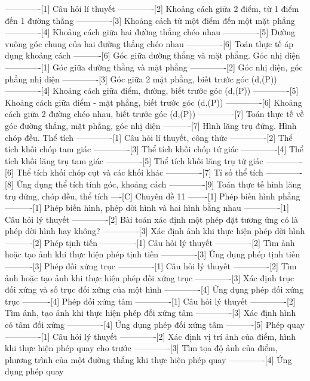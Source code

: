 -------------[1] Câu hỏi lí thuyết
-------------[2] Khoảng cách giữa 2 điểm, từ 1 điểm đến 1 đường thẳng
-------------[3] Khoảng cách từ một điểm đến một mặt phẳng
-------------[4] Khoảng cách giữa hai đường thẳng chéo nhau
-------------[5] Đường vuông góc chung của hai đường thẳng chéo nhau
-------------[6] Toán thực tế áp dụng khoảng cách
----------[6] Góc giữa đường thẳng và mặt phẳng. Góc nhị diện
-------------[1] Góc giữa đường thẳng và mặt phẳng
-------------[2] Góc nhị diện, góc phẳng nhị diện
-------------[3] Góc giữa 2 mặt phẳng, biết trước góc (d,(P))
-------------[4] Khoảng cách giữa điểm, đường, biết trước góc (d,(P))
-------------[5] Khoảng cách giữa điểm - mặt phẳng, biết trước góc (d,(P))
-------------[6] Khoảng cách giữa 2 đường chéo nhau, biết trước góc (d,(P))
-------------[7] Toán thực tế về góc đường thẳng, mặt phẳng, góc nhị diện
----------[7] Hình lăng trụ đứng. Hình chóp đều. Thể tích
-------------[1] Câu hỏi lí thuyết, công thức
-------------[2] Thể tích khối chóp tam giác
-------------[3] Thể tích khối chóp tứ giác
-------------[4] Thể tích khối lăng trụ tam giác
-------------[5] Thể tích khối lăng trụ tứ giác
-------------[6] Thể tích khối chóp cụt và các khối khác
-------------[7] Tỉ số thể tích
-------------[8] Ứng dụng thể tích tính góc, khoảng cách
-------------[9] Toán thực tế hình lăng trụ đứng, chóp đều, thể tích
----[C] Chuyên đề 11
-------[1] Phép biến hình phẳng
----------[1] Phép biến hình, phép dời hình và hai hình bằng nhau
-------------[1] Câu hỏi lý thuyết
-------------[2] Bài toán xác định một phép đặt tương ứng có là phép dời hình hay không?
-------------[3] Xác định ảnh khi thực hiện phép dời hình
----------[2] Phép tịnh tiến
-------------[1] Câu hỏi lý thuyết
-------------[2] Tìm ảnh hoặc tạo ảnh khi thực hiện phép tịnh tiến
-------------[3] Ứng dụng phép tịnh tiến
----------[3] Phép đối xứng trục
-------------[1] Câu hỏi lý thuyết
-------------[2] Tìm ảnh hoặc tạo ảnh khi thực hiện phép đối xứng trục
-------------[3] Xác định trục đối xứng và số trục đối xứng của một hình
-------------[4] Ứng dụng phép đối xứng trục
----------[4] Phép đối xứng tâm
-------------[1] Câu hỏi lý thuyết
-------------[2] Tìm ảnh, tạo ảnh khi thực hiện phép đối xứng tâm
-------------[3] Xác định hình có tâm đối xứng
-------------[4] Ứng dụng phép đối xứng tâm
----------[5] Phép quay
-------------[1] Câu hỏi lý thuyết
-------------[2] Xác định vị trí ảnh của điểm, hình khi thực hiện phép quay cho trước
-------------[3] Tìm tọa độ ảnh của điểm, phương trình của một đường thẳng khi thực hiện phép quay
-------------[4] Ứng dụng phép quay
